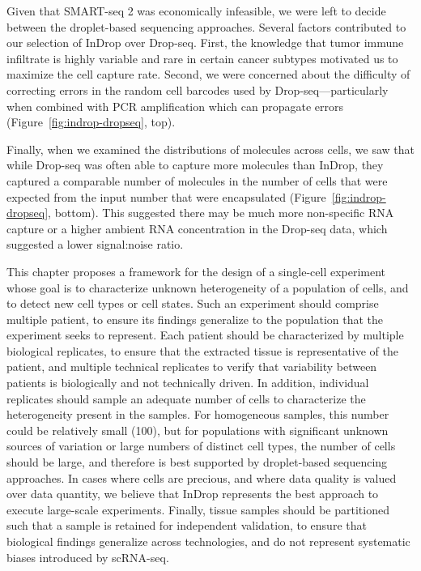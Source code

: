 Given that SMART-seq 2 was economically infeasible, we were left to decide between the droplet-based sequencing approaches.  
Several factors contributed to our selection of InDrop over Drop-seq. 
First, the knowledge that tumor immune infiltrate is highly variable and rare in certain cancer subtypes motivated us to maximize the cell capture rate.
Second, we were concerned about the difficulty of correcting errors in the random cell barcodes used by Drop-seq---particularly when combined with PCR amplification which can propagate errors (Figure~\ref{fig:indrop-dropseq}, top). 

Finally, when we examined the distributions of molecules across cells, we saw that while Drop-seq was often able to capture more molecules than InDrop, they captured a comparable number of molecules in the number of cells that were expected from the input number that were encapsulated (Figure~\ref{fig:indrop-dropseq}, bottom). 
This suggested there may be much more non-specific RNA capture or a higher ambient RNA concentration in the Drop-seq data, which suggested a lower signal:noise ratio. 

This chapter proposes a framework for the design of a single-cell experiment whose goal is to characterize unknown heterogeneity of a population of cells, and to detect new cell types or cell states. 
Such an experiment should comprise multiple patient, to ensure its findings generalize to the population that the experiment seeks to represent. 
Each patient should be characterized by multiple biological replicates, to ensure that the extracted tissue is representative of the patient, and multiple technical replicates to verify that variability between patients is biologically and not technically driven. 
In addition, individual replicates should sample an adequate number of cells to characterize the heterogeneity present in the samples. 
For homogeneous samples, this number could be relatively small (100), but for populations with significant unknown sources of variation or large numbers of distinct cell types, the number of cells should be large, and therefore is best supported by droplet-based sequencing approaches.
In cases where cells are precious, and where data quality is valued over data quantity, we believe that InDrop represents the best approach to execute large-scale experiments. 
Finally, tissue samples should be partitioned such that a sample is retained for independent validation, to ensure that biological findings generalize across technologies, and do not represent systematic biases introduced by scRNA-seq. 

